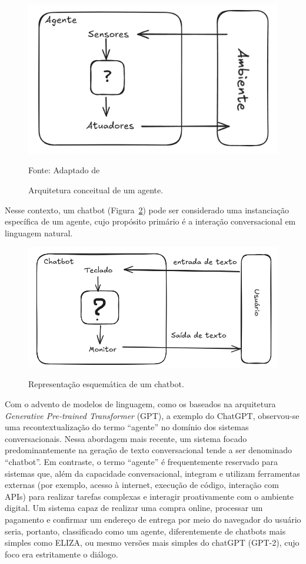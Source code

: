 \documentclass[14pt,a4paper,oneside]{book}
\begin{document}
\begin{figure}[!htb]
	\centering
	\caption{Arquitetura conceitual de um agente.}
	\includegraphics[width=0.7\linewidth]{./fig/original_agente.png}
	\label{fig:agente}
	{\footnotesize \centering

		Fonte: Adaptado de \cite{Russel2013}}
\end{figure}

Nesse contexto, um chatbot (Figura~\ref{fig:chatbot}) pode ser considerado uma instanciação específica de um agente, cujo propósito primário é a interação conversacional em linguagem natural.

\begin{figure}[!htb]
	\centering
	\caption{Representação esquemática de um chatbot.}
	\includegraphics[width=0.7\linewidth]{./fig/chatbot.png}
	\label{fig:chatbot}

\end{figure}

Com o advento de modelos de linguagem, como os baseados na arquitetura \textit{Generative Pre-trained Transformer} (GPT), a exemplo do ChatGPT, observou-se uma recontextualização do termo ``agente'' no domínio dos sistemas conversacionais. 
Nessa abordagem mais recente, um sistema focado predominantemente na geração de texto conversacional tende a ser denominado ``chatbot''. 
Em contraste, o termo ``agente'' é frequentemente reservado para sistemas que, além da capacidade conversacional, integram e utilizam ferramentas externas (por exemplo, acesso à internet, execução de código, interação com APIs) para realizar tarefas complexas e interagir proativamente com o ambiente digital. 
Um sistema capaz de realizar uma compra online, processar um pagamento e confirmar um endereço de entrega por meio do navegador do usuário seria, portanto, classificado como um agente, diferentemente de chatbots mais simples como ELIZA, ou mesmo versões mais simples do chatGPT (GPT-2), cujo foco era estritamente o diálogo.
\end{document}
